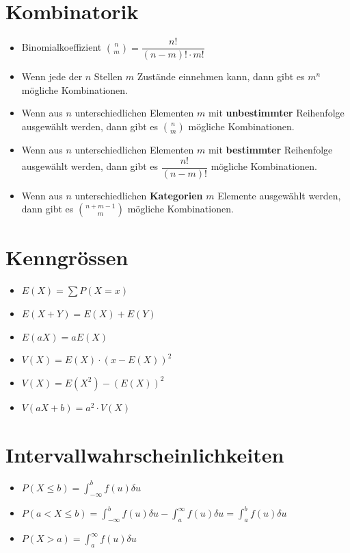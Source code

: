 \documentclass[8pt,a4paper]{scrartcl}
\begin{document}
\begin{multicols*}{3}
		\section{Kombinatorik}
			\begin{itemize}\itemsep0pt				
				\item Binomialkoeffizient ${n\choose m} = \dfrac{n!}{(n-m)!\cdot m!}$
				\item Wenn jede der $n$ Stellen $m$ Zustände einnehmen kann, dann gibt es $m^{n}$ mögliche Kombinationen.
				\item Wenn aus $n$ unterschiedlichen Elementen $m$ mit \textbf{unbestimmter} Reihenfolge ausgewählt werden, dann gibt es ${n\choose m}$ mögliche Kombinationen.
				\item Wenn aus $n$ unterschiedlichen Elementen $m$ mit  \textbf{bestimmter} Reihenfolge ausgewählt werden, dann gibt es $\dfrac{n!}{(n-m)!}$ mögliche Kombinationen.
				\item Wenn aus $n$ unterschiedlichen \textbf{Kategorien} $m$ Elemente ausgewählt werden, dann gibt es ${n+m-1\choose m}$ mögliche Kombinationen.
			\end{itemize}
			
		\section{Kenngrössen}
			\begin{itemize}\itemsep0pt				
				\item $E(X) = \sum P(X=x)$
				\item $E(X+Y) = E(X) + E(Y)$
				\item $E(aX) = aE(X)$
				\item $V(X) = E(X) \cdot (x-E(X))^{2}$
				\item $V(X) = E(X^{2}) - (E(X))^{2}$
				\item $V(aX+b) = a^{2} \cdot V(X)$
			\end{itemize}
			
		\section{Intervallwahrscheinlichkeiten}		
			\begin{itemize}\itemsep0pt				
				\item $P(X \leq b) = \int_{-\infty}^b f(u)\delta u$
				\item $P(a < X \leq b) = \int_{-\infty}^b f(u)\delta u - \int_a^\infty f(u)\delta u =  \int_a^b f(u)\delta u $
				\item $P(X > a) = \int_a^\infty f(u)\delta u$
			\end{itemize}	
			

\end{multicols*}
\end{document}
